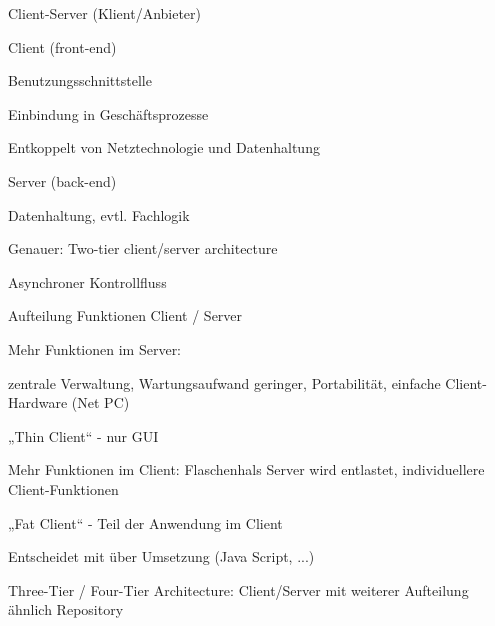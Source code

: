\documentclass[a4paper]{article}
\begin{document}
\begin{multicols}{3}
  Client-Server (Klient/Anbieter)
  \begin{itemize*}
    \item Client (front-end)
    \begin{itemize*}
      \item Benutzungsschnittstelle
      \item Einbindung in Geschäftsprozesse
      \item Entkoppelt von Netztechnologie und Datenhaltung
    \end{itemize*}
    \item Server (back-end)
    \begin{itemize*}
      \item Datenhaltung, evtl. Fachlogik
    \end{itemize*}
    \item Genauer: Two-tier client/server architecture
    \item Asynchroner Kontrollfluss
    \item Aufteilung Funktionen Client / Server
    \begin{itemize*}
      \item Mehr Funktionen im Server:
      \begin{itemize*}
        \item zentrale Verwaltung, Wartungsaufwand geringer, Portabilität, einfache Client-Hardware (Net PC)
        \item „Thin Client“ - nur GUI
      \end{itemize*}
      \item Mehr Funktionen im Client: Flaschenhals Server wird entlastet, individuellere Client-Funktionen
      \begin{itemize*}
        \item „Fat Client“ - Teil der Anwendung im Client
      \end{itemize*}
      \item Entscheidet mit über Umsetzung (Java Script, ...)
    \end{itemize*}
  \end{itemize*}

  Three-Tier / Four-Tier Architecture: Client/Server mit weiterer Aufteilung ähnlich Repository


\end{multicols}
\end{document}
